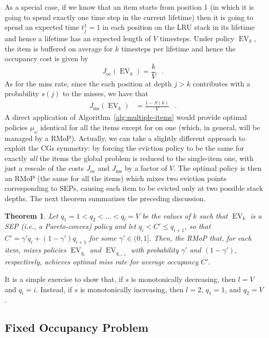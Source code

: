 \documentclass[11pt,a4paper]{article}
\DeclareMathOperator{\oc}{oc}
\DeclareMathOperator{\ms}{ms}
\DeclareMathOperator{\ev}{EV}
\DeclareMathOperator{\mf}{\enspace .}
\newtheorem{theorem}{Theorem}
\theoremstyle{definition}
\theoremstyle{remark}
\begin{document}
As a special case, if we know that an item starts from position 1 (in
which it is going to spend exactly one time step in the current lifetime)
then it is going to spend an expected time $t_j^1=1$ in each position on
the LRU stack in its lifetime and hence a lifetime has an expected
length of $V$ timesteps. Under policy $\ev_k$, the item is buffered on
average for $k$ timesteps per lifetime and hence the occupancy cost is
given by
\begin{equation}
  \label{eq:coc}
  J_{\oc}(\ev_k)=\frac{k}{V} \mf
\end{equation}
As for the miss rate, since the each position at depth $j>k$
contributes with a probability $s(j)$ to the misses, we have that
\begin{align}
  \label{eq:cms}
  J_{\ms}(\ev_k) &= \frac{1-S(k)}{V} \mf
\end{align}
A direct application of Algorithm~\ref{alg:multiple-items} would
provide optimal policies $\mu_\omega$ identical for all the items
except for on one (which, in general, will be managed by a
RMoP). Actually, we can take a slightly different approach to exploit
the CGs symmetry: by forcing the eviction policy to be the same for
exactly \emph{all} the items the global problem is reduced to the
single-item one, with just a rescale of the costs $J_{\oc}$ and
$J_{\ms}$ by a factor of $V$.  The optimal policy is then an RMoP (the
same for all the items) which mixes two eviction points corresponding
to SEPs, causing each item to be evicted only at two possible stack
depths. The next theorem summarizes the preceding discussion.
\begin{theorem}\label{thm:aveCap}
Let $q_1=1 < q_2 < \ldots < q_l=V$ be the values of $k$ such that
$\ev_k$ is a SEP (i.e., a Pareto-convex) policy and let $q_i<C' \leq
q_{i+1}$, so that $C'=\gamma' q_i + (1-\gamma')q_{i+1}$ for some
$\gamma' \in (0,1]$. Then, the RMoP that, for each item, mixes
policies $\ev_{q_i}$ and $\ev_{q_{i+1}}$ with probability $\gamma'$
and $(1-\gamma')$, respectively, achieves optimal miss rate for
average occupancy $C'$.
\end{theorem}
It is a simple exercise to show that, if $s$ is monotonically
decreasing, then $l=V$ and $q_i=i$.  Instead, if $s$ is monotonically
increasing, then $l=2$, $q_1=1$, and $q_2=V$.

\subsection{Fixed Occupancy Problem}
\label{sec:fixed-capac-probl}
\end{document}

